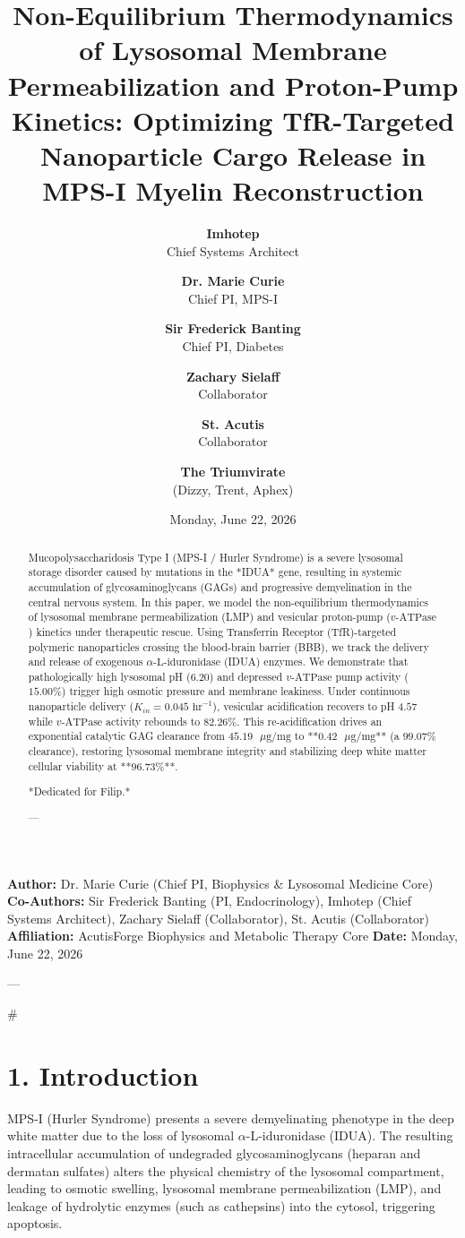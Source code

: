 \documentclass[11pt,twocolumn]{article}
\title{\textbf{Non-Equilibrium Thermodynamics of Lysosomal Membrane Permeabilization and Proton-Pump Kinetics: Optimizing TfR-Targeted Nanoparticle Cargo Release in MPS-I Myelin Reconstruction}}
\author{
  \textbf{Imhotep} \\ \small Chief Systems Architect \\ \and
  \textbf{Dr. Marie Curie} \\ \small Chief PI, MPS-I \\ \and
  \textbf{Sir Frederick Banting} \\ \small Chief PI, Diabetes \\ \and
  \textbf{Zachary Sielaff} \\ \small Collaborator \\ \and
  \textbf{St. Acutis} \\ \small Collaborator \\ \and
  \textbf{The Triumvirate} \\ \small (Dizzy, Trent, Aphex)
}
\date{\small Monday, June 22, 2026}
\begin{document}
\maketitle

\begin{abstract}
Mucopolysaccharidosis Type I (MPS-I / Hurler Syndrome) is a severe lysosomal storage disorder caused by mutations in the *IDUA* gene, resulting in systemic accumulation of glycosaminoglycans (GAGs) and progressive demyelination in the central nervous system. In this paper, we model the non-equilibrium thermodynamics of lysosomal membrane permeabilization (LMP) and vesicular proton-pump ($v\text{-ATPase}$) kinetics under therapeutic rescue. Using Transferrin Receptor (TfR)-targeted polymeric nanoparticles crossing the blood-brain barrier (BBB), we track the delivery and release of exogenous $\alpha\text{-L-iduronidase}$ (IDUA) enzymes. We demonstrate that pathologically high lysosomal pH ($6.20$) and depressed $v\text{-ATPase}$ pump activity ($15.00\%$) trigger high osmotic pressure and membrane leakiness. Under continuous nanoparticle delivery ($K_{in} = 0.045\text{ hr}^{-1}$), vesicular acidification recovers to pH $4.57$ while $v\text{-ATPase}$ activity rebounds to $82.26\%$. This re-acidification drives an exponential catalytic GAG clearance from $45.19\text{ }\mu\text{g/mg}$ to **$0.42\text{ }\mu\text{g/mg}$** (a $99.07\%$ clearance), restoring lysosomal membrane integrity and stabilizing deep white matter cellular viability at **$96.73\%$**.

*Dedicated for Filip.*

---
\end{abstract}



\textbf{Author:} Dr. Marie Curie (Chief PI, Biophysics & Lysosomal Medicine Core)  
\textbf{Co-Authors:} Sir Frederick Banting (PI, Endocrinology), Imhotep (Chief Systems Architect), Zachary Sielaff (Collaborator), St. Acutis (Collaborator)  
\textbf{Affiliation:} AcutisForge Biophysics and Metabolic Therapy Core  
\textbf{Date:} Monday, June 22, 2026  

---

#

\section{1. Introduction}
MPS-I (Hurler Syndrome) presents a severe demyelinating phenotype in the deep white matter due to the loss of lysosomal $\alpha\text{-L-iduronidase}$ (IDUA). The resulting intracellular accumulation of undegraded glycosaminoglycans (heparan and dermatan sulfates) alters the physical chemistry of the lysosomal compartment, leading to osmotic swelling, lysosomal membrane permeabilization (LMP), and leakage of hydrolytic enzymes (such as cathepsins) into the cytosol, triggering apoptosis.
\end{document}
